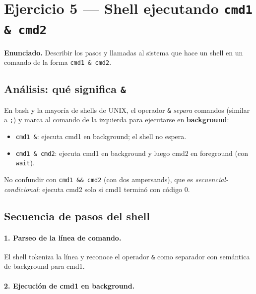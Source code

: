 \documentclass[11pt,a4paper]{article}
\begin{document}
\section{Ejercicio 5 --- Shell ejecutando \texttt{cmd1 \& cmd2}}

\textbf{Enunciado.} Describir los pasos y llamadas al sistema que
hace un shell en un comando de la forma \texttt{cmd1 \& cmd2}.

\subsection*{Análisis: qué significa \texttt{\&}}

En bash y la mayoría de shells de UNIX, el operador \texttt{\&}
\emph{separa} comandos (similar a \texttt{;}) y marca al comando
de la izquierda para ejecutarse en \textbf{background}:

\begin{itemize}[leftmargin=*,nosep]
    \item \texttt{cmd1 \&}: ejecuta cmd1 en background; el shell no
        espera.
    \item \texttt{cmd1 \& cmd2}: ejecuta cmd1 en background y luego
        cmd2 en foreground (con \texttt{wait}).
\end{itemize}

\begin{importante}
No confundir con \texttt{cmd1 \&\& cmd2} (con dos ampersands), que
es \emph{secuencial-condicional}: ejecuta cmd2 solo si cmd1
terminó con código 0.
\end{importante}

\subsection*{Secuencia de pasos del shell}

\paragraph{1. Parseo de la línea de comando.}
El shell tokeniza la línea y reconoce el operador \texttt{\&} como
separador con semántica de background para cmd1.

\paragraph{2. Ejecución de cmd1 en background.}
\end{document}
